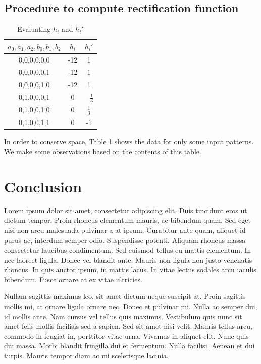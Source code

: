 \subsection{Procedure to compute rectification function}
\vspace{2mm}
\begin{table}[ht]
    \centering
    \begin{tabular}{|c|c|c|} \hline
      $a_0,a_1,a_2,b_0,b_1,b_2$ & $h_i$ & $h_i'$ \\ \hline
       0,0,0,0,0,0 & -12 & 1\\ \hline
       0,0,0,0,0,1 & -12 & 1\\ \hline
       0,0,0,0,1,0 & -12 & 1\\ \hline
       0,1,0,0,0,1 & 0 & $-\frac{1}{3}$\\ \hline
       0,1,0,0,1,0 & 0 & $\frac{1}{3}$\\ \hline
       0,1,0,0,1,1 & 0 & -1 \\ \hline
    \end{tabular}
    \caption{Evaluating $h_i$ and $h_i'$}
    \label{tab:quosol}
\end{table}

In order to conserve space, Table \ref{tab:quosol} shows the data for only some input patterns. We make some observations based on the contents of this table. 

\section{Conclusion}
Lorem ipsum dolor sit amet, consectetur adipiscing elit. Duis tincidunt eros ut dictum tempor. Proin rhoncus elementum mauris, ac bibendum quam. Sed eget nisi non arcu malesuada pulvinar a at ipsum. Curabitur ante quam, aliquet id purus ac, interdum semper odio. Suspendisse potenti. Aliquam rhoncus massa consectetur faucibus condimentum. Sed euismod tellus eu mattis elementum. In nec laoreet ligula. Donec vel blandit ante. Mauris non ligula non justo venenatis rhoncus. In quis auctor ipsum, in mattis lacus. In vitae lectus sodales arcu iaculis bibendum. Fusce ornare at ex vitae ultricies.

Nullam sagittis maximus leo, sit amet dictum neque suscipit at. Proin sagittis mollis mi, at ornare ligula ornare nec. Donec et pulvinar mi. Nulla ac semper dui, id mollis ante. Nam cursus vel tellus quis maximus. Vestibulum quis nunc sit amet felis mollis facilisis sed a sapien. Sed sit amet nisi velit. Mauris tellus arcu, commodo in feugiat in, porttitor vitae urna. Vivamus in aliquet elit. Nunc quis dui massa. Morbi blandit fringilla dui et fermentum. Nulla facilisi. Aenean et dui turpis. Mauris tempor diam ac mi scelerisque lacinia. 
